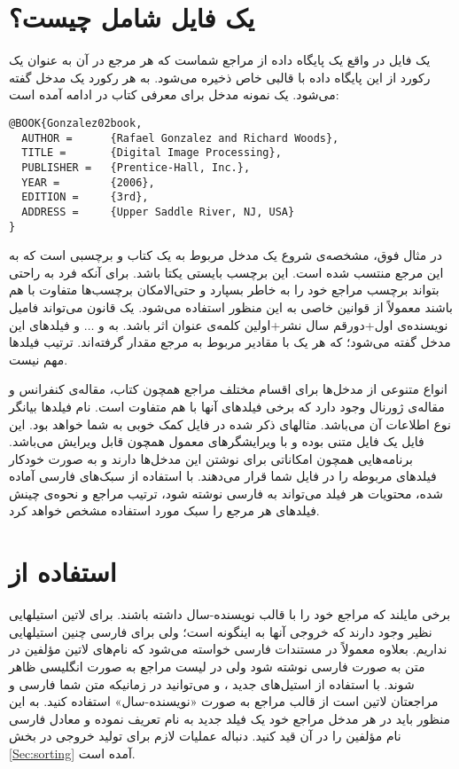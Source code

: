 \documentclass[a4paper]{article}
\theoremstyle{plain}\newtheorem{question}{پرسش}
\begin{document}
\section{یک فایل \texorpdfstring{}{bib} شامل چیست؟}
یک فایل  در واقع یک پایگاه داده از مراجع  شماست که هر مرجع در آن به عنوان یک رکورد از این پایگاه داده
با قالبی خاص ذخیره می‌شود. به هر رکورد یک مدخل گفته می‌شود. یک نمونه مدخل برای معرفی کتاب  در ادامه آمده است:
\begin{LTR}
\begin{verbatim}
@BOOK{Gonzalez02book,
  AUTHOR =      {Rafael Gonzalez and Richard Woods},
  TITLE =       {Digital Image Processing},
  PUBLISHER =   {Prentice-Hall, Inc.},
  YEAR =        {2006},
  EDITION =     {3rd},
  ADDRESS =     {Upper Saddle River, NJ, USA}
}
\end{verbatim}
\end{LTR}
در مثال فوق،  مشخصه‌ی شروع یک مدخل مربوط به یک کتاب و  برچسبی است که به این مرجع منتسب شده است.
 این برچسب بایستی یکتا باشد. برای آنکه فرد به راحتی بتواند برچسب
مراجع خود را به خاطر بسپارد و حتی‌الامکان برچسب‌ها متفاوت با هم باشند معمولاً از قوانین خاصی به این منظور استفاده می‌شود. یک قانون می‌تواند فامیل نویسنده‌ی
اول+دورقم سال نشر+اولین کلمه‌ی عنوان اثر باشد. به  و $\dots$ و  فیلدهای این مدخل گفته می‌شود؛ که هر یک با مقادیر مربوط
به مرجع مقدار گرفته‌اند. ترتیب فیلدها مهم نیست. 

انواع متنوعی از مدخل‌ها برای اقسام مختلف مراجع همچون کتاب، مقاله‌ی کنفرانس و مقاله‌ی ژورنال وجود دارد که برخی فیلدهای آنها با هم متفاوت است. 
نام فیلدها بیانگر نوع اطلاعات آن می‌باشد. مثالهای ذکر شده در فایل  کمک خوبی به شما خواهد بود. 
این فایل یک فایل متنی بوده و با ویرایشگرهای معمول همچون  قابل ویرایش می‌باشد. برنامه‌هایی همچون 
 امکاناتی برای نوشتن این مدخل‌ها دارند و به صورت خودکار فیلدهای مربوطه را در فایل   شما قرار می‌دهند.  
با استفاده از سبک‌های فارسی آماده شده، محتویات هر فیلد می‌تواند به فارسی نوشته شود، ترتیب مراجع و نحوه‌ی چینش فیلدهای هر مرجع را سبک مورد استفاده 
مشخص خواهد کرد.


\section{استفاده از \texorpdfstring{}{natbib}}\label{Sec:natbib}
برخی مایلند که مراجع خود را با قالب نویسنده-سال داشته باشند. برای لاتین استیلهایی نظیر  وجود دارند که خروجی آنها به اینگونه است؛ ولی برای فارسی چنین استیلهایی نداریم. 
بعلاوه معمولاً در مستندات فارسی خواسته می‌شود که نام‌های لاتین مؤلفین در متن به صورت فارسی نوشته شود ولی در لیست مراجع به صورت انگلیسی ظاهر شوند. 
با استفاده از استیل‌های جدید ،   و  می‌توانید در زمانیکه متن شما فارسی و مراجعتان لاتین است از قالب مراجع به صورت «نویسنده-سال» استفاده کنید. به این منظور باید در هر مدخل مراجع خود یک فیلد جدید به نام  تعریف نموده و معادل فارسی نام مؤلفین را در آن قید کنید. 
دنباله عملیات لازم برای تولید خروجی در بخش \ref{Sec:sorting} آمده است.
\end{document}
